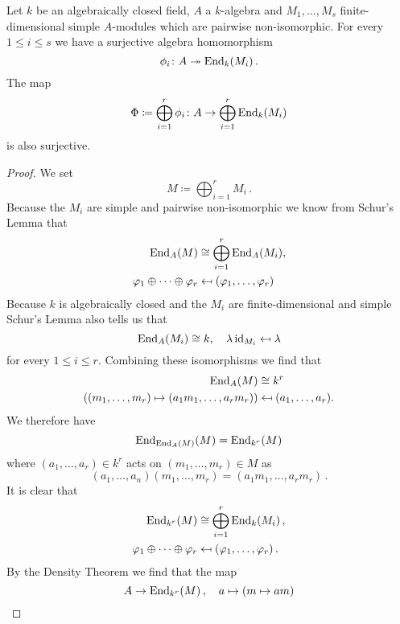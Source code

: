 \begin{lem}\label{lem: map into sum endomorphisms surjective}
  Let $k$ be an algebraically closed field, $A$ a $k$-algebra and $M_1, \dotsc, M_s$ finite-dimensional simple $A$-modules which are pairwise non-isomorphic.
  For every $1 \leq i \leq s$ we have a surjective algebra homomorphism
  \[
                        \phi_i
    \colon              A
    \twoheadrightarrow  \operatorname{End}_k(M_i) \,.
  \]
  The map
  \[
              \Phi
    \coloneqq \bigoplus_{i=1}^r \phi_i
    \colon    A
    \to       \bigoplus_{i=1}^r \operatorname{End}_k(M_i)
  \]
  is also surjective.
\end{lem}
\begin{proof}
  We set
  \[
    M \coloneqq \bigoplus_{i=1}^r M_i \,.
  \]
  Because the $M_i$ are simple and pairwise non-isomorphic we know from Schur’s Lemma that
  \begin{align*}
                \operatorname{End}_A(M)
    &\cong      \bigoplus_{i=1}^r \operatorname{End}_A(M_i), \\
                \varphi_1 \oplus \dotsb \oplus \varphi_r
    &\mapsfrom  (\varphi_1, \dotsc, \varphi_r)
  \end{align*}
  Because $k$ is algebraically closed and the $M_i$ are finite-dimensional and simple Schur’s Lemma also tells us that
  \[
              \operatorname{End}_A(M_i)
    \cong     k,
    \quad     \lambda \operatorname{id}_{M_i}
    \mapsfrom \lambda
  \]
  for every $1 \leq i \leq r$.
  Combining these isomorphisms we find that
  \begin{align*}
                \operatorname{End}_A(M)
    &\cong      k^r \\
                (
                          (m_1, \dotsc, m_r)
                  \mapsto (a_1 m_1, \dotsc, a_r m_r)
                )
    &\mapsfrom  (a_1, \dotsc, a_r).
  \end{align*}
  We therefore have
  \[
      \operatorname{End}_{\operatorname{End}_A(M)}(M)
    = \operatorname{End}_{k^r}(M)
  \]
  where $(a_1, \dotsc, a_r) \in k^r$ acts on $(m_1, \dotsc, m_r) \in M$ as
  \[
      (a_1, \dotsc, a_n)(m_1, \dotsc, m_r)
    = (a_1 m_1, \dotsc, a_r m_r) \,.
  \]
  It is clear that
  \begin{align*}
                \operatorname{End}_{k^r}(M)
    &\cong      \bigoplus_{i=1}^r \operatorname{End}_k(M_i) \,, \\
                \varphi_1 \oplus \dotsb \oplus \varphi_r
    &\mapsfrom  (\varphi_1, \dotsc, \varphi_r) \,.
  \end{align*}
  By the Density Theorem we find that the map
  \[
            A
    \to     \operatorname{End}_{k^r}(M) \,,
    \quad   a
    \mapsto (m \mapsto am)
  \]

\end{proof}
